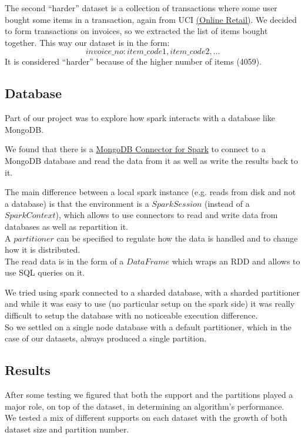 \documentclass[a4paper]{article}
\begin{document}
	The second ``harder'' dataset is a collection of transactions where some user bought some items in a transaction, again from UCI \href{https://archive.ics.uci.edu/ml/datasets/online+retail}{(Online Retail)}.
	We decided to form transactions on invoices, so we extracted the list of items bought together.
	This way our dataset is in the form:
	\[ invoice\_no: item\_code1, item\_code2, \ldots \]
	It is considered ``harder'' because of the higher number of items (4059).

	\subsection{Database}
	Part of our project was to explore how spark interacts with a database like MongoDB.
	
	We found that there is a \href{https://www.mongodb.com/docs/spark-connector/current/}{MongoDB Connector for Spark} to connect to a MongoDB database and read the data from it as well as 	write the results back to it.
	
	The main difference between a local spark instance (e.g. reads from disk and not a database) is that the environment is a $SparkSession$ (instead of a $SparkContext$), which allows to use connectors to read and write data from databases as well as repartition it.\\
	A $partitioner$ can be specified to regulate how the data is handled and to change how it is distributed.\\	
	The read data is in the form of a $DataFrame$ which wraps an RDD and allows to use SQL queries on it.

	We tried using spark connected to a sharded database, with a sharded partitioner and while it was easy to use (no particular setup on the spark side) it was really difficult to setup the database with no noticeable execution difference.\\
	So we settled on a single node database with a default partitioner, which in the case of our datasets, always produced a single partition.\\

	\subsection{Results}
	After some testing we figured that both the support and the partitions played a major role, on top of the dataset,
	in determining an algorithm's performance.\\
	We tested a mix of different supports on each dataset with the growth of both dataset size and partition number.\\
\end{document}
